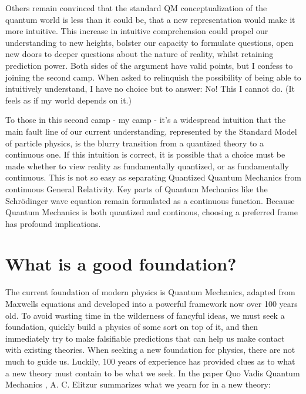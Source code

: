 \documentclass[notitlepage]{report}
\begin{document}
Others remain convinced that the standard QM conceptualization of the quantum world is less than it could be, that a new representation would make it more intuitive. This increase in intuitive comprehension could propel our understanding to new heights, bolster our capacity to formulate questions, open new doors to deeper questions about the nature of reality, whilst retaining  prediction power. Both sides of the argument have valid points, but I confess to joining the second camp. When asked to  relinquish the possibility of being able to intuitively understand, I have no choice but to answer: No! This I cannot do. (It feels as if my world depends on it.)

To those in this second camp - my camp - it's a widespread intuition that the main fault line of our current understanding, represented by the Standard Model of particle physics, is the blurry transition from a quantized theory to a continuous one. If this intuition is correct, it is possible that a choice must be made whether to view reality as  fundamentally quantized, or as fundamentally continuous. This is not so easy as separating Quantized Quantum Mechanics from continuous General Relativity. Key parts of Quantum Mechanics like the Schrödinger wave equation remain formulated as a continuous function. Because Quantum Mechanics is both quantized and continous, choosing a preferred frame has profound implications.


\section*{What is a good foundation?}
The current foundation of modern physics is Quantum Mechanics,  adapted from Maxwells equations and developed into a powerful framework now over 100 years old. To avoid wasting time in the wilderness of fancyful ideas, we must seek a foundation, quickly build a physics of some sort on top of it, and then immediately try to make falsifiable predictions that can help us make contact with existing theories. When seeking a new foundation for physics, there are not much to guide us. Luckily, 100 years of experience has provided clues as to what a new theory must contain to be what we seek.  In the paper Quo Vadis Quantum Mechanics  \cite{QuoVadis1ACElitzur}, A. C. Elitzur summarizes what we yearn for in a new theory:
\end{document}
